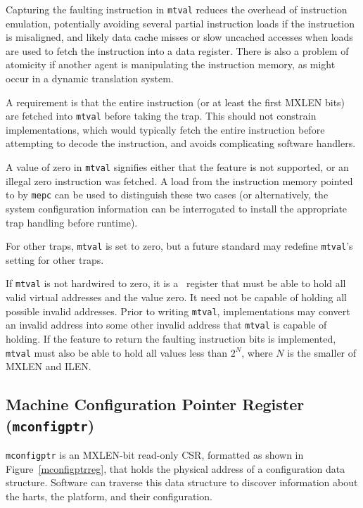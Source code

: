 \begin{commentary}
  Capturing the faulting instruction in {\tt mtval} reduces the
  overhead of instruction emulation, potentially avoiding several
  partial instruction loads if the instruction is misaligned, and
  likely data cache misses or slow uncached accesses when loads are
  used to fetch the instruction into a data register.  There is also a
  problem of atomicity if another agent is manipulating the
  instruction memory, as might occur in a dynamic translation system.

  A requirement is that the entire instruction (or at least the first
  MXLEN bits) are fetched into {\tt mtval} before taking the trap.
  This should not constrain implementations, which would typically
  fetch the entire instruction before attempting to decode the
  instruction, and avoids complicating software handlers.

  A value of zero in {\tt mtval} signifies either that the feature is
  not supported, or an illegal zero instruction was fetched.  A load
  from the instruction memory pointed to by {\tt mepc} can be used to
  distinguish these two cases (or alternatively, the system
  configuration information can be interrogated to install the
  appropriate trap handling before runtime).
\end{commentary}

For other traps, {\tt mtval} is set to zero, but a future standard may
redefine {\tt mtval}'s setting for other traps.

If {\tt mtval} is not hardwired to zero, it is a \warl\ register that must be
able to hold all valid virtual addresses and the value zero.
It need not be capable of holding all
possible invalid addresses.
Prior to writing {\tt mtval}, implementations may convert an invalid address
into some other invalid address that {\tt mtval} is capable of holding.
If the feature to return the faulting instruction bits is implemented, {\tt
mtval} must also be able to hold all values less than $2^N$, where $N$ is the
smaller of MXLEN and ILEN.

\subsection{Machine Configuration Pointer Register ({\tt mconfigptr})}

{\tt mconfigptr} is an MXLEN-bit read-only CSR, formatted as shown in
Figure~\ref{mconfigptrreg}, that holds the physical address of a configuration
data structure.
Software can traverse this data structure to discover information about
the harts, the platform, and their configuration.

